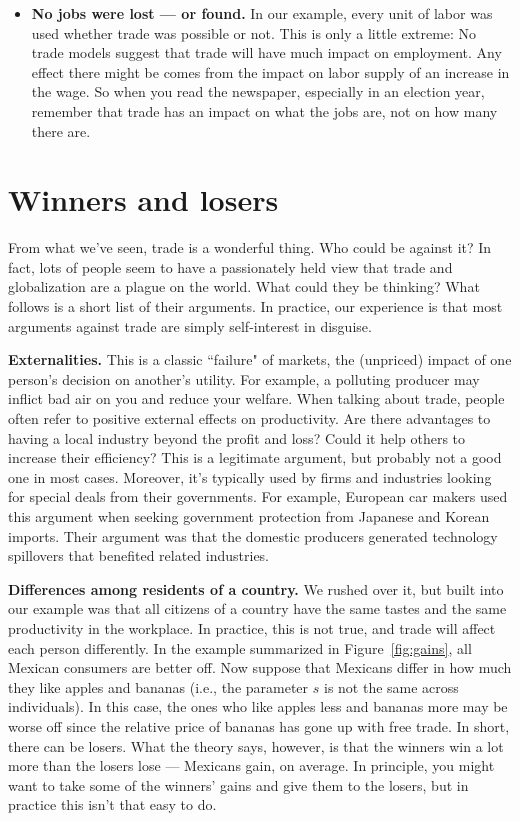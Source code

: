 \begin{itemize}
\item \textbf{No jobs were lost --- or found.}
In our example, every unit of labor was used whether trade was possible or not.
This is only a little extreme:  No trade models suggest that trade will have much
impact on employment.  Any effect there might be comes from the
impact on labor supply of an increase in the wage.
So when you read the newspaper, especially in an election year,
remember that trade has an impact on what the jobs are, not on how
many there are.
\end{itemize}

\section{Winners and losers}

From what we've seen, trade is a wonderful thing.  Who could
be against it?  In fact, lots of people seem to have a
passionately held view that trade and globalization are a
plague on the world.  What could they be thinking? What follows is
a short list of their arguments.
In practice, our experience is that most arguments against trade
are simply self-interest in disguise.


\textbf{Externalities.}  This is a classic ``failure" of markets,
the (unpriced) impact of one person's decision on another's
utility. For example, a polluting producer may inflict bad air on
you and reduce your welfare. When talking about trade, people
often refer to positive external effects on productivity.  Are
there advantages to having a local industry beyond the profit and
loss? Could it help others to increase their efficiency? This is a
legitimate argument, but probably not a good one in most cases.
Moreover, it's typically used by firms and industries looking for
special deals from their governments. For example,
European car makers used this argument when seeking government protection from
Japanese and Korean imports. Their argument was that the domestic
producers generated technology spillovers that benefited
related industries.

\textbf{Differences among residents of a country.} We rushed over
it, but built into our example was that all citizens of a
country have the same tastes and the same productivity in the
workplace. In practice, this is not true, and trade will affect
each person differently. In the example summarized in
Figure~\ref{fig:gains}, all Mexican consumers are better off. Now
suppose that Mexicans differ in how much they like apples and bananas
(i.e., the parameter $s$ is not the same across
individuals). In this case, the ones who like apples less and
bananas more may be worse off since the relative price of bananas
has gone up with free trade. In short, there can be losers. What
the theory says, however, is that the winners win a lot more than
the losers lose --- Mexicans gain, on average.
In principle, you might want to take some of the winners' gains and give them to the
losers, but in practice this isn't that easy to do.

